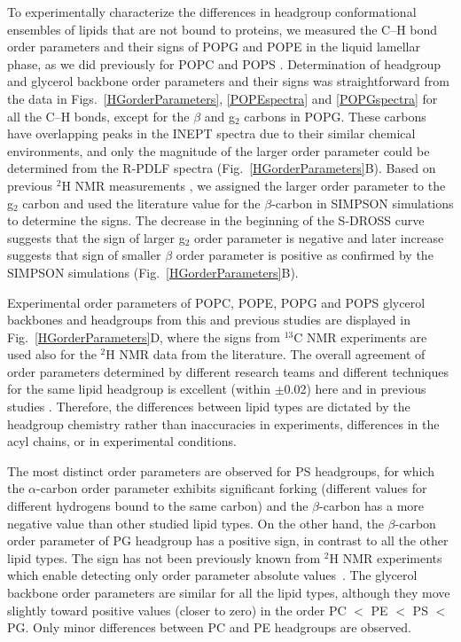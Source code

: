 \documentclass[journal=jpcbfk,manuscript=article]{achemso}
\begin{document}
To experimentally characterize the differences in headgroup conformational ensembles of lipids that are not
bound to proteins, we measured the C--H bond order parameters
and their signs of POPG and POPE in the liquid lamellar phase, as we did previously for POPC and POPS \cite{ferreira13,ferreira16,antila19}.
Determination of headgroup and glycerol backbone order parameters and their signs
was straightforward from the data in Figs.~\ref{HGorderParameters}, \ref{POPEspectra} and \ref{POPGspectra}
for all the C--H bonds, except for the $\beta$ and g$_2$ carbons in POPG.
These carbons have overlapping peaks in the INEPT spectra due to their similar chemical environments,
and only the magnitude of the larger order parameter could be determined from the R-PDLF spectra (Fig.~\ref{HGorderParameters}B).
Based on previous $^2$H NMR measurements \cite{wohlgemuth80,gally81,borle85},
we assigned the larger order parameter to the g$_2$ carbon
and used the literature value for the $\beta$-carbon in SIMPSON simulations to determine the signs.
The decrease in the beginning of the S-DROSS curve suggests that the sign of larger g$_2$ order parameter
is negative and later increase suggests that sign of smaller $\beta$ order parameter is positive as confirmed by the SIMPSON simulations (Fig.~\ref{HGorderParameters}B).

Experimental order parameters of POPC, POPE, POPG and POPS glycerol backbones and headgroups from this and previous studies are displayed in Fig.~\ref{HGorderParameters}D, where the signs from $^{13}$C NMR experiments are used also for the $^2$H NMR data from the literature. The overall agreement of order parameters determined by different research teams and different techniques for the same lipid headgroup is excellent (within $\pm$0.02) here and in previous studies \cite{botan15,ollila16,antila19}. Therefore, the differences between lipid types are dictated by the headgroup chemistry rather than inaccuracies in experiments, differences in the acyl chains, or in experimental conditions.


The most distinct order parameters are observed for PS headgroups, for which the $\alpha$-carbon order parameter exhibits significant forking (different values for different hydrogens bound to the same carbon) and the $\beta$-carbon has a more negative value than other studied lipid types. On the other hand, the $\beta$-carbon order parameter of PG headgroup has a positive sign, in contrast to all the other lipid types. The sign has not been previously known from $^2$H NMR experiments which enable detecting only order parameter absolute values~\cite{wohlgemuth80,gally81,borle85}. The glycerol backbone order parameters are similar for all the lipid types, although they move slightly toward positive values (closer to zero) in the order PC $<$ PE $<$ PS $<$ PG. Only minor differences between PC and PE headgroups are observed.
\end{document}
